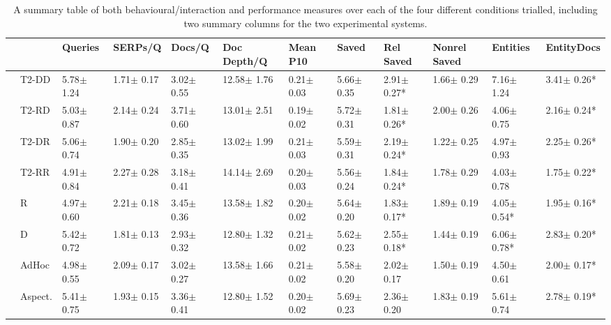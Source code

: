 \begin{table*}[t]
    \caption{A summary table of both behavioural/interaction and performance measures over each of the four different conditions trialled, including two summary columns for the two experimental systems. }
    \label{tbl_actions}
    \renewcommand{\arraystretch}{1.4}
    \begin{center}
    \begin{tabulary}{\textwidth}{L{0.1cm}D{1.0cm}|D{1.2cm}|D{1.2cm}|D{1.2cm}|D{1.2cm}|D{1.2cm}|D{1.2cm}|D{1.2cm}|D{1.2cm}|D{1.2cm}|D{1.2cm}}
    \hline
    
    & & Queries & SERPs/Q & Docs/Q & Doc Depth/Q & Mean P10 & Saved & Rel Saved & Nonrel Saved & Entities & EntityDocs \\ \hline\hline
    
     & T2-DD & 5.78$\pm$ 1.24 & 1.71$\pm$ 0.17 & 3.02$\pm$ 0.55 & 12.58$\pm$ 1.76 & 0.21$\pm$ 0.03 & 5.66$\pm$ 0.35 & 2.91$\pm$ 0.27* & 1.66$\pm$ 0.29 & 7.16$\pm$ 1.24 & 3.41$\pm$ 0.26*\\ \hline
& T2-RD & 5.03$\pm$ 0.87 & 2.14$\pm$ 0.24 & 3.71$\pm$ 0.60 & 13.01$\pm$ 2.51 & 0.19$\pm$ 0.02 & 5.72$\pm$ 0.31 & 1.81$\pm$ 0.26* & 2.00$\pm$ 0.26 & 4.06$\pm$ 0.75 & 2.16$\pm$ 0.24*\\ \hline
& T2-DR & 5.06$\pm$ 0.74 & 1.90$\pm$ 0.20 & 2.85$\pm$ 0.35 & 13.02$\pm$ 1.99 & 0.21$\pm$ 0.03 & 5.59$\pm$ 0.31 & 2.19$\pm$ 0.24* & 1.22$\pm$ 0.25 & 4.97$\pm$ 0.93 & 2.25$\pm$ 0.26*\\ \hline
& T2-RR & 4.91$\pm$ 0.84 & 2.27$\pm$ 0.28 & 3.18$\pm$ 0.41 & 14.14$\pm$ 2.69 & 0.20$\pm$ 0.03 & 5.56$\pm$ 0.24 & 1.84$\pm$ 0.24* & 1.78$\pm$ 0.29 & 4.03$\pm$ 0.78 & 1.75$\pm$ 0.22*\\ \hline\hline

     & R & 4.97$\pm$ 0.60 & 2.21$\pm$ 0.18 & 3.45$\pm$ 0.36 & 13.58$\pm$ 1.82 & 0.20$\pm$ 0.02 & 5.64$\pm$ 0.20 & 1.83$\pm$ 0.17* & 1.89$\pm$ 0.19 & 4.05$\pm$ 0.54* & 1.95$\pm$ 0.16*\\ \hline
& D & 5.42$\pm$ 0.72 & 1.81$\pm$ 0.13 & 2.93$\pm$ 0.32 & 12.80$\pm$ 1.32 & 0.21$\pm$ 0.02 & 5.62$\pm$ 0.23 & 2.55$\pm$ 0.18* & 1.44$\pm$ 0.19 & 6.06$\pm$ 0.78* & 2.83$\pm$ 0.20*\\ \hline\hline

     & AdHoc & 4.98$\pm$ 0.55 & 2.09$\pm$ 0.17 & 3.02$\pm$ 0.27 & 13.58$\pm$ 1.66 & 0.21$\pm$ 0.02 & 5.58$\pm$ 0.20 & 2.02$\pm$ 0.17 & 1.50$\pm$ 0.19 & 4.50$\pm$ 0.61 & 2.00$\pm$ 0.17*\\ \hline
& Aspect. & 5.41$\pm$ 0.75 & 1.93$\pm$ 0.15 & 3.36$\pm$ 0.41 & 12.80$\pm$ 1.52 & 0.20$\pm$ 0.02 & 5.69$\pm$ 0.23 & 2.36$\pm$ 0.20 & 1.83$\pm$ 0.19 & 5.61$\pm$ 0.74 & 2.78$\pm$ 0.19*\\ \hline
    
    
    \end{tabulary}
    \end{center}
\end{table*}

